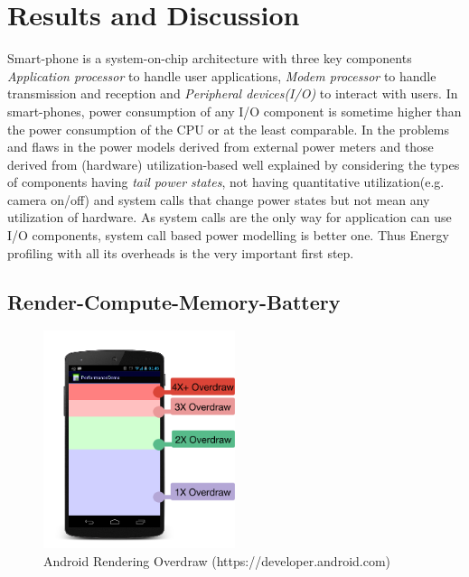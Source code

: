 \chapter{Results and Discussion}

Smart-phone is a system-on-chip architecture with three key components  \emph{Application processor} to handle user applications, \emph{Modem processor} to handle transmission and reception and \emph{Peripheral devices(I/O)} to interact with users. In smart-phones, power consumption of any I/O component is sometime higher than the power consumption of the CPU or at the least comparable. In \cite{EModel} the problems and flaws in the power models derived from external power meters and those derived from (hardware) utilization-based well explained by considering the types of components having \textit{tail power states},  not having quantitative utilization(e.g. camera on/off) and system calls that change power states but not mean any utilization of hardware. As system calls are the only way for application can use I/O components, system call based power modelling is better one. Thus Energy profiling with all its overheads is the very important first step.
\section{Render-Compute-Memory-Battery}
\begin{figure}[h]
	\begin{center}	
		\includegraphics[width=0.5\textwidth]{Figures/c1overdraw.png}
	\end{center}
	\caption{Android Rendering Overdraw  \small(https://developer.android.com)}
	\label{fig:overdraw}
\end{figure} 
